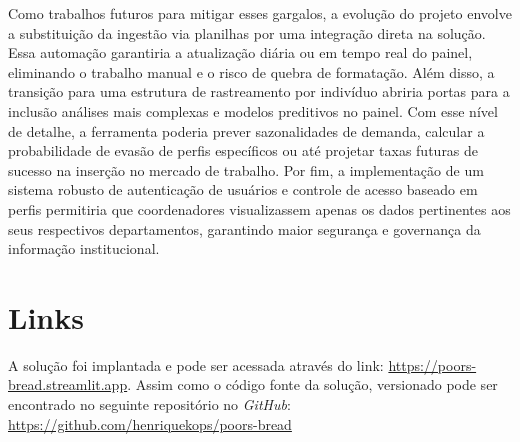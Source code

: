 \documentclass[12pt]{article}
\begin{document}
Como trabalhos futuros para mitigar esses gargalos, a evolução do projeto envolve a substituição da ingestão via planilhas por uma integração direta na solução. Essa automação garantiria a atualização diária ou em tempo real do painel, eliminando o trabalho manual e o risco de quebra de formatação. Além disso, a transição para uma estrutura de rastreamento por indivíduo abriria portas para a inclusão análises mais complexas e modelos preditivos no painel. Com esse nível de detalhe, a ferramenta poderia prever sazonalidades de demanda, calcular a probabilidade de evasão de perfis específicos ou até projetar taxas futuras de sucesso na inserção no mercado de trabalho. Por fim, a implementação de um sistema robusto de autenticação de usuários e controle de acesso baseado em perfis permitiria que coordenadores visualizassem apenas os dados pertinentes aos seus respectivos departamentos, garantindo maior segurança e governança da informação institucional.

\appendix
\section{Links}
A solução foi implantada e pode ser acessada através do link: \url{https://poors-bread.streamlit.app}. Assim como o código fonte da solução, versionado pode ser encontrado no seguinte repositório no \textit{GitHub}: \url{https://github.com/henriquekops/poors-bread}



\end{document}
